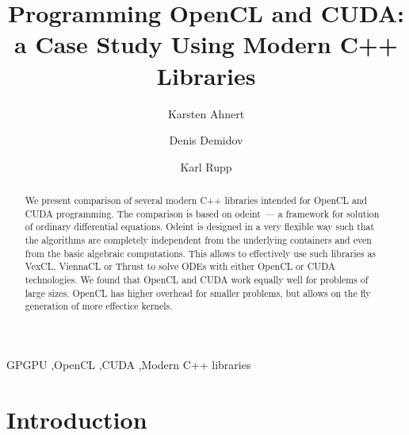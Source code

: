 \documentclass[1p]{elsarticle}
\begin{document}
\begin{frontmatter}

\title{Programming OpenCL and CUDA:\\a Case Study Using Modern C++ Libraries}

\author{Karsten Ahnert}
\address{
Institut f\"ur Physik und Astronomie, Universit\"at Potsdam,\\
Karl-Liebknecht-Strasse 24/25, 14476 Potsdam-Golm, Germany
}

\author{Denis Demidov}
\address{
Kazan Branch of Joint Supercomputer Center,
Russian Academy of Sciences,\\
Lobachevsky st. 2/31, 420008 Kazan, Russia
}

\author{Karl Rupp}
\address{
Institute for Microelectronics, TU Wien,\\
Gusshausstrasse 27-29/E360, A-1040 Wien, Austria
}

\begin{abstract}
    We present comparison of several modern C++ libraries intended for
    OpenCL and CUDA programming. The comparison is based on odeint~---
    a framework for solution of ordinary differential
    equations. Odeint is designed in a very flexible way such that the
    algorithms are completely independent from the underlying
    containers and even from the basic algebraic computations. This
    allows to effectively use such libraries as VexCL, ViennaCL or
    Thrust to solve ODEs with either OpenCL or CUDA technologies. We
    found that OpenCL and CUDA work equally well for problems of large
    sizes. OpenCL has higher overhead for smaller problems, but allows
    on the fly generation of more effectice kernels.
\end{abstract}

\begin{keyword}
    GPGPU \sep OpenCL \sep CUDA \sep Modern C++ libraries
\end{keyword}

\end{frontmatter}





%
%
\section{Introduction}
\end{document}
